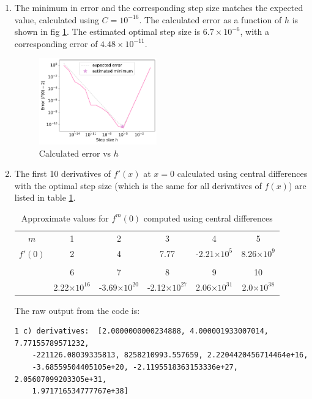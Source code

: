 \documentclass{article}
\begin{document}
\begin{enumerate}
\begin{enumerate}
    \item The minimum in error and the corresponding step size matches the expected value, calculated using $C=10^{-16}$. 
    The calculated error as a function of $h$ is shown in fig \ref{fig:1b}. The estimated optimal step size is $6.7\times 10^{-6}$, with a corresponding error of $4.48\times 10^{-11}$. 
    \begin{figure}[h]
        \centering 
        \includegraphics[width=0.48\textwidth]{Q1b.pdf}
        \caption{Calculated error vs $h$}
        \label{fig:1b}
      \end{figure}

    \item The first 10 derivatives of $f'(x)$ at $x=0$ calculated using central differences with the optimal step size (which is the same for all derivatives of $f(x)$)
    are listed in table \ref{tab:1c}.
    \begin{table}[h]
        \centering
        \begin{tabular}{c|c c c c c}
            $m$ & 1 & 2 & 3 & 4 & 5 \\
            $f'(0)$ & 2 & 4 & 7.77 & -2.21$\times 10^5$ & 8.26$\times 10^9$ \\ [0.2 em] \hline  \\[-0.8em]
            & 6 & 7 & 8 & 9 & 10\\
            & 2.22$\times 10^{16}$ & -3.69$\times 10^{20}$ & -2.12$\times 10^{27}$ & 2.06$\times 10^{31}$ & 2.0$\times 10^{38}$
        \end{tabular}
        \caption{Approximate values for $f^m(0)$ computed using central differences}
        \label{tab:1c}
    \end{table}
    The raw output from the code is:
\begin{verbatim}
1 c) derivatives:  [2.0000000000234888, 4.000001933007014, 7.77155789571232, 
    -221126.08039335813, 8258210993.557659, 2.2204420456714464e+16, 
    -3.68559504405105e+20, -2.1195518363153336e+27, 2.05607099203305e+31, 
    1.971716534777767e+38]
\end{verbatim}
\end{enumerate}


\end{enumerate}
\end{document}
